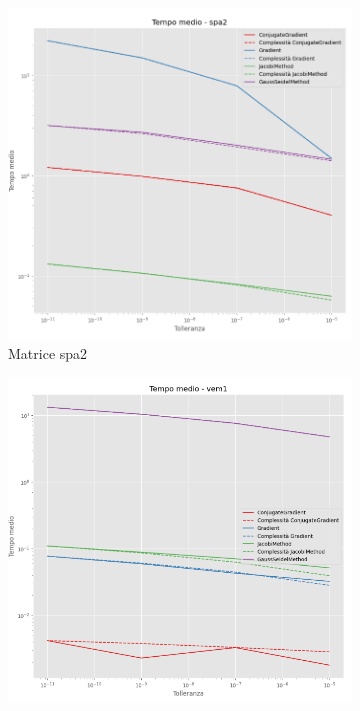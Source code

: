 \begin{figure}[!ht]
\begin{subfigure}{0.45\textwidth}
        \includegraphics[width=\textwidth]{./../report/Progetto_1_bis/img/time_spa2.png}
        \caption{Matrice spa2}
        \label{fig:time_spa2}
    \end{subfigure}
    \hfill
    \begin{subfigure}{0.45\textwidth}
        \centering
        \includegraphics[width=\textwidth]{./../report/Progetto_1_bis/img/time_vem1.png}

\end{subfigure}
\end{figure}
